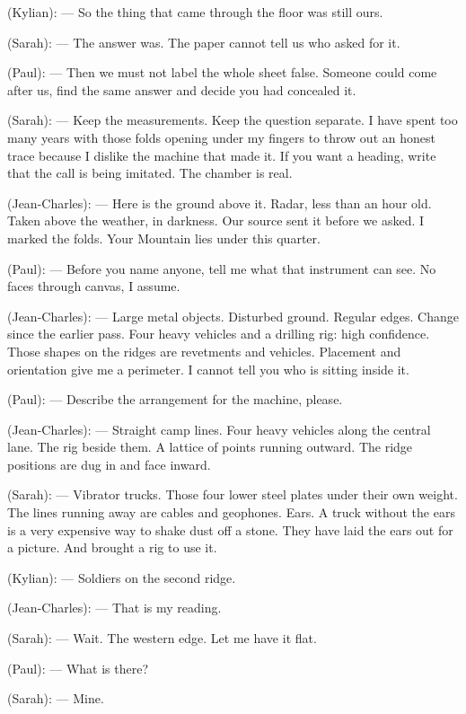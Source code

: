 \begin{room}
(Kylian): --- So the thing that came through the floor was still ours.

(Sarah): --- The answer was. The paper cannot tell us who asked for it.

(Paul): --- Then we must not label the whole sheet false. Someone could come after us, find the same answer and decide you had concealed it.

(Sarah): --- Keep the measurements. Keep the question separate. I have spent too many years with those folds opening under my fingers to throw out an honest trace because I dislike the machine that made it. If you want a heading, write that the call is being imitated. The chamber is real.

\centerline{}

(Jean-Charles): --- Here is the ground above it. Radar, less than an hour old. Taken above the weather, in darkness. Our source sent it before we asked. I marked the folds. Your Mountain lies under this quarter.

(Paul): --- Before you name anyone, tell me what that instrument can see. No faces through canvas, I assume.

(Jean-Charles): --- Large metal objects. Disturbed ground. Regular edges. Change since the earlier pass. Four heavy vehicles and a drilling rig: high confidence. Those shapes on the ridges are revetments and vehicles. Placement and orientation give me a perimeter. I cannot tell you who is sitting inside it.

(Paul): --- Describe the arrangement for the machine, please.

(Jean-Charles): --- Straight camp lines. Four heavy vehicles along the central lane. The rig beside them. A lattice of points running outward. The ridge positions are dug in and face inward.

(Sarah): --- Vibrator trucks. Those four lower steel plates under their own weight. The lines running away are cables and geophones. Ears. A truck without the ears is a very expensive way to shake dust off a stone. They have laid the ears out for a picture. And brought a rig to use it.

(Kylian): --- Soldiers on the second ridge.

(Jean-Charles): --- That is my reading.

(Sarah): --- Wait. The western edge. Let me have it flat.

(Paul): --- What is there?

(Sarah): --- Mine.


\end{room}
